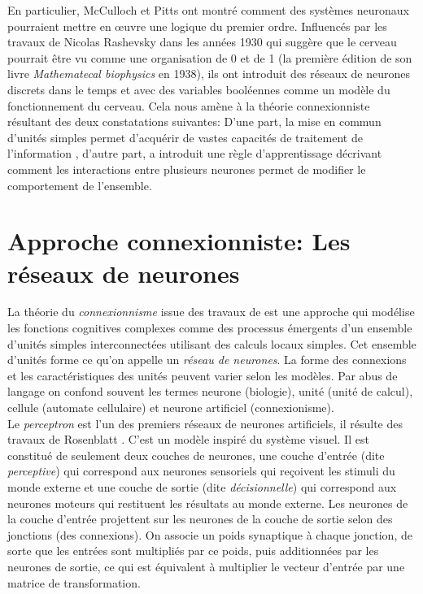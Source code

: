 En particulier, McCulloch et Pitts ont montré comment des systèmes neuronaux pourraient mettre en œuvre une logique du premier ordre. Influencés par les travaux de Nicolas Rashevsky dans les années 1930 qui suggère que le cerveau pourrait être vu comme une organisation de 0 et de 1 (la première édition de son livre \textit{Mathematecal biophysics} en 1938), ils ont introduit des réseaux de neurones discrets dans le temps et avec des variables booléennes comme un modèle du fonctionnement du cerveau. Cela nous amène à la théorie connexionniste résultant des deux constatations suivantes: D'une part, la mise en commun d'unités simples permet d'acquérir de vastes capacités de traitement de l'information \cite{Rashevsky:1960}, d'autre part, \cite{Hebb:1949} a introduit une règle d'apprentissage décrivant comment les interactions entre plusieurs neurones permet de modifier le comportement de l'ensemble.


\section{Approche connexionniste: Les réseaux de neurones}

La théorie du \textit{connexionnisme} issue des travaux de \cite{Hebb:1949, Hayek:1952} est une approche qui modélise les fonctions cognitives complexes comme des processus émergents d'un ensemble d'unités simples interconnectées utilisant des calculs locaux simples. Cet ensemble d'unités forme ce qu'on appelle un \textit{réseau de neurones}. La forme des connexions et les caractéristiques des unités peuvent varier selon les modèles. Par abus de langage on confond souvent les termes neurone (biologie), unité (unité de calcul), cellule (automate cellulaire) et neurone artificiel (connexionisme).\\

Le \textit{perceptron} est l'un des premiers réseaux de neurones artificiels, il résulte des travaux de Rosenblatt \cite{Rosenblatt:1958}. C'est un modèle inspiré du système visuel. Il est constitué de seulement deux couches de neurones, une couche d'entrée (dite \textit{perceptive}) qui correspond aux neurones sensoriels qui reçoivent les stimuli du monde externe et une couche de sortie (dite \textit{décisionnelle}) qui correspond aux neurones moteurs qui restituent les résultats au monde externe. Les neurones de la couche d'entrée projettent sur les neurones de la couche de sortie selon des jonctions (des connexions). On associe un poids synaptique à chaque jonction, de sorte que les entrées sont multipliés par ce poids, puis additionnées par les neurones de sortie, ce qui est équivalent à multiplier le vecteur d'entrée par une matrice de transformation.\\

